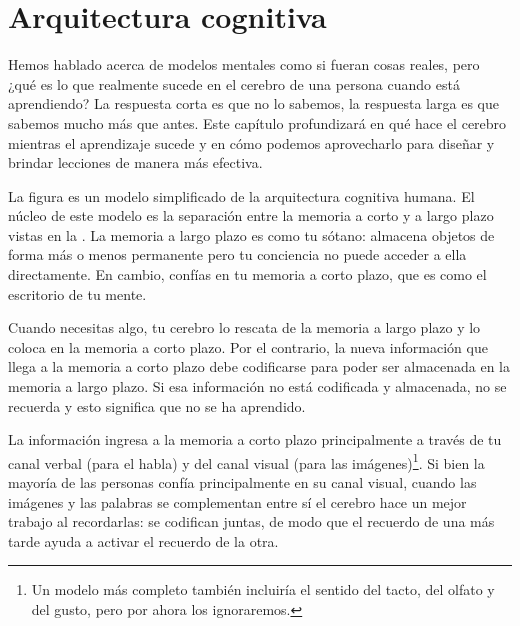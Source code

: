 \chapter{Arquitectura cognitiva}\label{s:architecture}

Hemos hablado acerca de modelos mentales como si fueran cosas reales,
pero ¿qué es lo que realmente sucede en el cerebro de una persona cuando está aprendiendo?
La respuesta corta es que no lo sabemos, la respuesta larga es que sabemos mucho más que antes.
Este capítulo profundizará en qué hace el cerebro mientras el aprendizaje sucede
y en cómo podemos aprovecharlo para diseñar y brindar lecciones de manera más efectiva.



La figura  es un modelo simplificado de la arquitectura cognitiva humana. 
El núcleo de este modelo es la separación entre la memoria a corto y a largo plazo vistas en la .
La memoria a largo plazo es como tu sótano:
almacena objetos de forma más o menos permanente
pero tu conciencia no puede acceder a ella directamente.
En cambio,
confías en tu memoria a corto plazo,
que es como el escritorio de tu mente.

Cuando necesitas algo,
tu cerebro lo rescata de la memoria a largo plazo  
y lo coloca en la memoria a corto plazo.
Por el contrario, la nueva información que llega a la memoria a corto plazo
debe codificarse para poder ser almacenada en la memoria a largo plazo.
Si esa información no está codificada y almacenada, no se recuerda y esto significa que  
no se ha aprendido.

La información ingresa a la memoria a corto plazo principalmente
a través de tu canal verbal (para el habla)
y del canal visual
(para las imágenes)\footnote{
  Un modelo más completo
  también incluiría el sentido del tacto, del olfato y del gusto,
  pero por ahora los ignoraremos.}.
Si bien la mayoría de las personas confía principalmente en su canal visual,
cuando las imágenes y las palabras se complementan entre sí
el cerebro hace un mejor trabajo al recordarlas:
se codifican juntas,
de modo que el recuerdo de una más tarde ayuda a activar el recuerdo de la otra.

